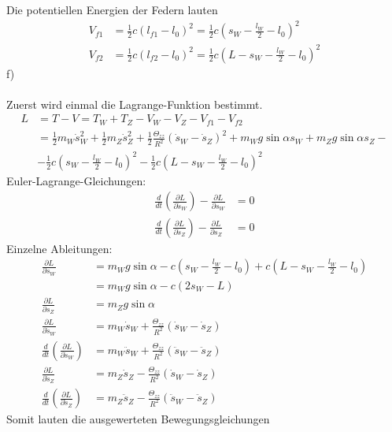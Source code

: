 Die potentiellen Energien der Federn lauten
\begin{align*}
	V_{f1} &= \frac{1}{2} c (l_{f1} - l_0)^2 = \frac{1}{2} c \left(s_W - \frac{l_W}{2} - l_0\right)^2 \\
	V_{f2} &= \frac{1}{2} c (l_{f2} - l_0)^2 = \frac{1}{2} c \left(L - s_W - \frac{l_W}{2} - l_0\right)^2
\end{align*}
f) \\ \\
Zuerst wird einmal die Lagrange-Funktion bestimmt.
\begin{align*}
	L &= T - V = T_W + T_Z - V_W - V_Z - V_{f1} - V_{f2} \\
	  &= \frac{1}{2}m_W\dot{s}_W^2 + \frac{1}{2}m_Z\dot{s}_Z^2 + \frac{1}{2}\frac{\Theta_{zz}}{R^2}(\dot{s}_W - \dot{s}_Z)^2 + m_W g \sin\alpha s_W + m_Z g \sin\alpha s_Z -\\
	  &- \frac{1}{2} c \left(s_W - \frac{l_W}{2} - l_0\right)^2 - \frac{1}{2} c \left(L - s_W - \frac{l_W}{2} - l_0\right)^2
\end{align*}
Euler-Lagrange-Gleichungen:
\begin{align*}
	\frac{d}{dt}\left(\frac{\partial L}{\partial \dot{s}_W}\right) - \frac{\partial L}{\partial s_W} &= 0 \\
	\frac{d}{dt}\left(\frac{\partial L}{\partial \dot{s}_Z}\right) - \frac{\partial L}{\partial s_Z} &= 0
\end{align*}
Einzelne Ableitungen:
\begin{align*}
	\frac{\partial L}{\partial s_W} &= m_W g \sin\alpha - c\left(s_W - \frac{l_W}{2} - l_0\right) + c\left(L - s_W - \frac{l_W}{2} - l_0\right) \\
	&= m_W g \sin\alpha - c(2s_W - L) \\
	\frac{\partial L}{\partial s_Z} &= m_Z g \sin\alpha \\
	\frac{\partial L}{\partial \dot{s}_W} &= m_W \dot{s}_W + \frac{\Theta_{zz}}{R^2}(\dot{s}_W - \dot{s}_Z) \\
	\frac{d}{dt}\left(\frac{\partial L}{\partial \dot{s}_W}\right) &= m_W \ddot{s}_W + \frac{\Theta_{zz}}{R^2}(\ddot{s}_W - \ddot{s}_Z) \\
	\frac{\partial L}{\partial \dot{s}_Z} &= m_Z\dot{s}_Z - \frac{\Theta_{zz}}{R^2}(\dot{s}_W - \dot{s}_Z) \\
	\frac{d}{dt}\left(\frac{\partial L}{\partial \dot{s}_Z}\right) &= m_Z\ddot{s}_Z - \frac{\Theta_{zz}}{R^2}(\ddot{s}_W - \ddot{s}_Z)
\end{align*}
Somit lauten die ausgewerteten Bewegungsgleichungen
